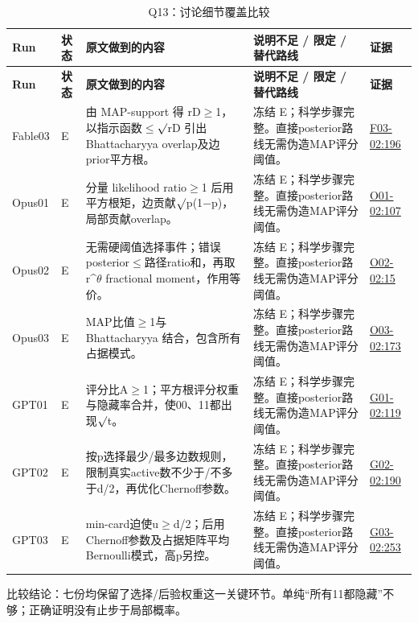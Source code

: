 \documentclass[11pt,a4paper]{article}
\begin{document}
{\fontsize{9.0}{12.6}\selectfont
\setlength{\tabcolsep}{2.5pt}
\begin{longtable}{>{\raggedright\arraybackslash}p{}>{\raggedright\arraybackslash}p{}>{\raggedright\arraybackslash}p{}>{\raggedright\arraybackslash}p{}>{\raggedright\arraybackslash}p{}}
\caption{Q13：讨论细节覆盖比较}\\
\toprule
\textbf{Run} & \textbf{状态} & \textbf{原文做到的内容} & \textbf{说明不足 / 限定 / 替代路线} & \textbf{证据}\tabularnewline
\midrule
\endfirsthead
\toprule
\textbf{Run} & \textbf{状态} & \textbf{原文做到的内容} & \textbf{说明不足 / 限定 / 替代路线} & \textbf{证据}\tabularnewline
\midrule
\endhead
{}Fable03 & E & 由 MAP-support 得 rD\ensuremath{\geq}1，以指示函数\ensuremath{\leq}\ensuremath{\surd}rD 引出 Bhattacharyya overlap及边prior平方根。 & 冻结 E；科学步骤完整。直接posterior路线无需伪造MAP评分阈值。 & \hyperref[src:F03-02]{F03-02:196}\tabularnewline
{}Opus01 & E & 分量 likelihood ratio\ensuremath{\geq}1 后用平方根矩，边贡献\ensuremath{\surd}p(1\ensuremath{-}p)，局部贡献overlap。 & 冻结 E；科学步骤完整。直接posterior路线无需伪造MAP评分阈值。 & \hyperref[src:O01-02]{O01-02:107}\tabularnewline
{}Opus02 & E & 无需硬阈值选择事件；错误posterior\ensuremath{\leq}路径ratio和，再取 r\textasciicircum{}\ensuremath{\theta} fractional moment，作用等价。 & 冻结 E；科学步骤完整。直接posterior路线无需伪造MAP评分阈值。 & \hyperref[src:O02-02]{O02-02:15}\tabularnewline
{}Opus03 & E & MAP比值\ensuremath{\geq}1与 Bhattacharyya 结合，包含所有占据模式。 & 冻结 E；科学步骤完整。直接posterior路线无需伪造MAP评分阈值。 & \hyperref[src:O03-02]{O03-02:173}\tabularnewline
{}GPT01 & E & 评分比A\ensuremath{\geq}1；平方根评分权重与隐藏率合并，使00、11都出现\ensuremath{\surd}t。 & 冻结 E；科学步骤完整。直接posterior路线无需伪造MAP评分阈值。 & \hyperref[src:G01-02]{G01-02:119}\tabularnewline
{}GPT02 & E & 按p选择最少/最多边数规则，限制真实active数不少于/不多于d/2，再优化Chernoff参数。 & 冻结 E；科学步骤完整。直接posterior路线无需伪造MAP评分阈值。 & \hyperref[src:G02-02]{G02-02:190}\tabularnewline
{}GPT03 & E & min-card迫使u\ensuremath{\geq}d/2；后用Chernoff参数及占据矩阵平均Bernoulli模式，高p另控。 & 冻结 E；科学步骤完整。直接posterior路线无需伪造MAP评分阈值。 & \hyperref[src:G03-02]{G03-02:253}\tabularnewline
\bottomrule
\end{longtable}
}
比较结论：七份均保留了选择/后验权重这一关键环节。单纯“所有11都隐藏”不够；正确证明没有止步于局部概率。
\end{document}
